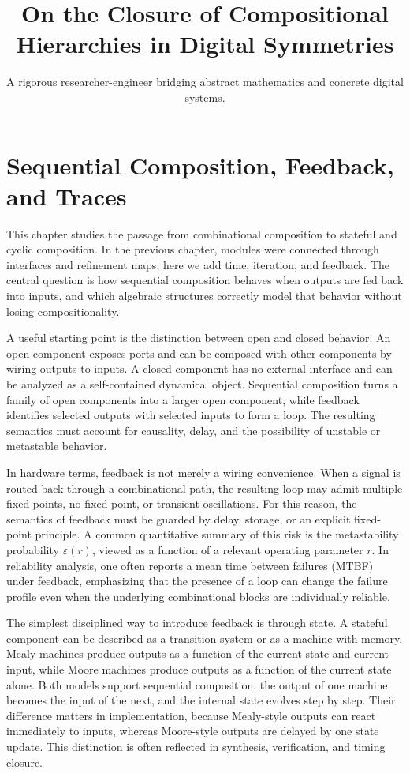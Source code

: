 \documentclass[11pt]{article}
\title{On the Closure of Compositional Hierarchies in Digital Symmetries}
\author{A rigorous researcher-engineer bridging abstract mathematics and concrete digital systems.}
\begin{document}
\section*{Sequential Composition, Feedback, and Traces}

This chapter studies the passage from combinational composition to stateful and cyclic composition. In the previous chapter, modules were connected through interfaces and refinement maps; here we add time, iteration, and feedback. The central question is how sequential composition behaves when outputs are fed back into inputs, and which algebraic structures correctly model that behavior without losing compositionality.

A useful starting point is the distinction between open and closed behavior. An open component exposes ports and can be composed with other components by wiring outputs to inputs. A closed component has no external interface and can be analyzed as a self-contained dynamical object. Sequential composition turns a family of open components into a larger open component, while feedback identifies selected outputs with selected inputs to form a loop. The resulting semantics must account for causality, delay, and the possibility of unstable or metastable behavior.

In hardware terms, feedback is not merely a wiring convenience. When a signal is routed back through a combinational path, the resulting loop may admit multiple fixed points, no fixed point, or transient oscillations. For this reason, the semantics of feedback must be guarded by delay, storage, or an explicit fixed-point principle. A common quantitative summary of this risk is the metastability probability \(\varepsilon(r)\), viewed as a function of a relevant operating parameter \(r\). In reliability analysis, one often reports a mean time between failures (MTBF) under feedback, emphasizing that the presence of a loop can change the failure profile even when the underlying combinational blocks are individually reliable.

The simplest disciplined way to introduce feedback is through state. A stateful component can be described as a transition system or as a machine with memory. Mealy machines produce outputs as a function of the current state and current input, while Moore machines produce outputs as a function of the current state alone. Both models support sequential composition: the output of one machine becomes the input of the next, and the internal state evolves step by step. Their difference matters in implementation, because Mealy-style outputs can react immediately to inputs, whereas Moore-style outputs are delayed by one state update. This distinction is often reflected in synthesis, verification, and timing closure.
\end{document}
